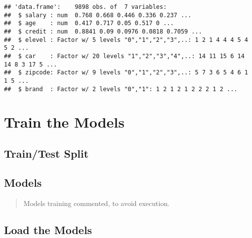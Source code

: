 \documentclass[
]{article}
\newenvironment{Shaded}{\begin{snugshade}}{\end{snugshade}}
\newcommand{\AttributeTok}[1]{\textcolor[rgb]{0.77,0.63,0.00}{#1}}
\newcommand{\CommentTok}[1]{\textcolor[rgb]{0.56,0.35,0.01}{\textit{#1}}}
\newcommand{\ConstantTok}[1]{\textcolor[rgb]{0.00,0.00,0.00}{#1}}
\newcommand{\DecValTok}[1]{\textcolor[rgb]{0.00,0.00,0.81}{#1}}
\newcommand{\FunctionTok}[1]{\textcolor[rgb]{0.00,0.00,0.00}{#1}}
\newcommand{\NormalTok}[1]{#1}
\newcommand{\OtherTok}[1]{\textcolor[rgb]{0.56,0.35,0.01}{#1}}
\newcommand{\SpecialCharTok}[1]{\textcolor[rgb]{0.00,0.00,0.00}{#1}}
\begin{document}
\begin{verbatim}
## 'data.frame':    9898 obs. of  7 variables:
##  $ salary : num  0.768 0.668 0.446 0.336 0.237 ...
##  $ age    : num  0.417 0.717 0.05 0.517 0 ...
##  $ credit : num  0.8841 0.09 0.0976 0.0818 0.7059 ...
##  $ elevel : Factor w/ 5 levels "0","1","2","3",..: 1 2 1 4 4 4 5 4 5 2 ...
##  $ car    : Factor w/ 20 levels "1","2","3","4",..: 14 11 15 6 14 14 8 3 17 5 ...
##  $ zipcode: Factor w/ 9 levels "0","1","2","3",..: 5 7 3 6 5 4 6 1 1 5 ...
##  $ brand  : Factor w/ 2 levels "0","1": 1 2 1 2 1 2 2 2 1 2 ...
\end{verbatim}

\hypertarget{train-the-models}{%
\section{Train the Models}\label{train-the-models}}

\hypertarget{traintest-split}{%
\subsection{Train/Test Split}\label{traintest-split}}

\begin{Shaded}
\end{Shaded}

\hypertarget{models}{%
\subsection{Models}\label{models}}

\begin{quote}
Models training commented, to avoid execution.
\end{quote}

\hypertarget{load-the-models}{%
\subsection{Load the Models}\label{load-the-models}}
\end{document}
